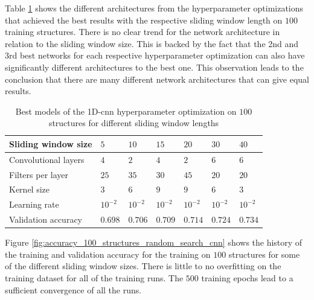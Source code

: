 \documentclass[conference]{IEEEtran}
\begin{document}
Table \ref{tab:hyperparameters_100_structures_cnn} shows the different architectures from the hyperparameter optimizations that achieved the best results with the respective sliding window length on $ 100 $ training structures. There is no clear trend for the network architecture in relation to the sliding window size. This is backed by the fact that the 2nd and 3rd best networks for each respective hyperparameter optimization can also have significantly different architectures to the best one. This observation leads to the conclusion that there are many different network architectures that can give equal results.

\begin{table}[htp]
	\centering
	\caption{Best models of the 1D-\gls{cnn} hyperparameter optimization on $ 100 $ structures for different sliding window lengths}
	\label{tab:hyperparameters_100_structures_cnn}
	\setlength{\tabcolsep}{3pt} %
	\begin{tabular}{l|llllll}
		Sliding window size & $ 5 $ & $ 10 $ & $ 15 $ & $ 20 $ & $ 30 $ & $ 40 $ \\
		\hline
		Convolutional layers & $ 4 $ & $ 2 $ & $ 4 $ & $ 2 $ & $ 6 $ & $ 6 $ \\
		Filters per layer & $ 25 $ & $ 35 $ & $ 30 $ & $ 45 $ & $ 20 $ & $ 20 $ \\
		Kernel size & $ 3 $ & $ 6 $ & $ 9 $ & $ 9 $ & $ 6 $ & $ 3 $ \\
		Learning rate & $ 10^{-2} $ & $ 10^{-2} $ & $ 10^{-2} $ & $ 10^{-2} $ & $ 10^{-2} $ & $ 10^{-2} $ \\
		\hline
		Validation accuracy & $ 0.698 $ & $ 0.706 $ & $ 0.709 $ & $ 0.714 $ & $ 0.724 $ & $ 0.734 $
	\end{tabular}
\end{table}

Figure \ref{fig:accuracy_100_structures_random_search_cnn} shows the history of the training and validation accuracy for the training on $ 100 $ structures for some of the different sliding window sizes. There is little to no overfitting on the training dataset for all of the training runs. The $ 500 $ training epochs lead to a sufficient convergence of all the runs.
\end{document}
